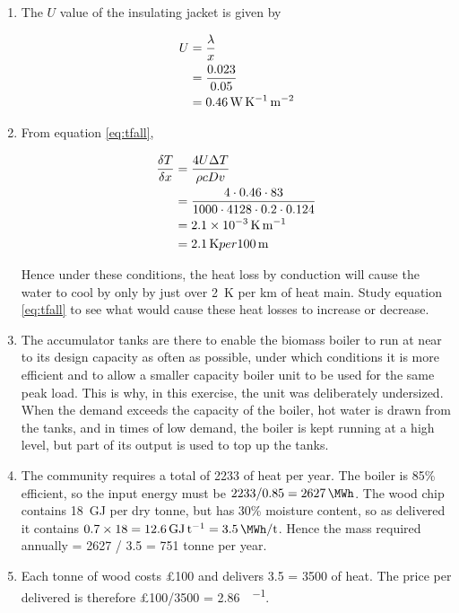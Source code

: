 \documentclass[parskip=half]{scrartcl}
\begin{document}
\begin{enumerate}
\item The $U$ value of the insulating jacket is given by

\begin{align}
U &=\dfrac{\lambda}{x}\\&=\dfrac{0.023}{0.05}\notag\\&=\SI{0.46}{\watt\per\kelvin\per\metre\squared}
\label{eq:uvalue}
\end{align}

\item From equation \eqref{eq:tfall},

\begin{align}
\dfrac{\delta T}{\delta x}&=\dfrac{4U\Delta T}{\rho c D v}\\ &=\dfrac{4\cdot 0.46\cdot 83}{1000\cdot 4128\cdot 0.2\cdot 0.124}\notag\\ &=\SI{2.1e-3}{\kelvin\per\metre}\notag\\ &=\SI{2.1}{\kelvin} per \SI{100}{\metre}\notag
\end{align}

Hence under these conditions, the heat loss by conduction will cause the water to cool by only by just over \SI{2}{\kelvin} per km of heat main. Study equation \eqref{eq:tfall} to see what would cause these heat losses to increase or decrease.

\item The accumulator tanks are there to enable the biomass boiler to run at near to its design capacity as often as possible, under which conditions it is more efficient and to allow a smaller capacity boiler unit to be used for the same peak load. This is why, in this exercise, the unit was deliberately undersized. When the demand exceeds the capacity of the boiler, hot water is drawn from the tanks, and in times of low demand, the boiler is kept running at a high level, but part of its output is used to top up the tanks. 

\item The community requires a total of \SI{2233}{\MWh} of heat per year. The boiler is 85\% efficient, so the input energy must be $2233 / 0.85 = \SI{2627}{\MWh}$. The wood chip contains \SI{18}{\giga\joule} per dry tonne, but has 30\% moisture content, so as delivered it contains $0.7\times18= \SI{12.6}{\giga\joule\per\tonne}=\SI{3.5}{\MWh\per\tonne}$. Hence the mass required annually = 2627 / 3.5 = 751 tonne per year.

\item Each tonne of wood costs £100 and delivers \SI{3.5}{\MWh} = \SI{3500}{\kWhr} of heat. The price per delivered \si{\kWhr} is therefore £100/3500 = \SI{2.86}{\pence\per\kWhr}.


\end{enumerate}
\end{document}
